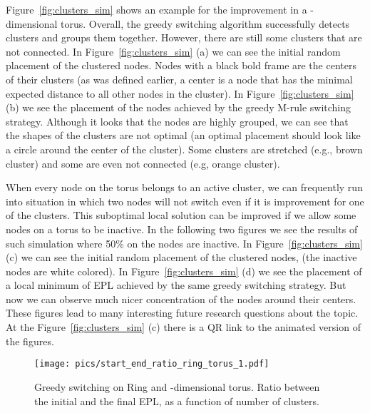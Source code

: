 \documentclass[conference]{IEEEtran}
\begin{document}
Figure~\ref{fig:clusters_sim} shows an example for the improvement in a -dimensional torus.
Overall, the greedy switching algorithm successfully detects clusters and groups them together. However, there are still some clusters that are not connected. In Figure~\ref{fig:clusters_sim} (a) we can see the initial random placement of the clustered nodes. Nodes with a black bold frame are the centers of their clusters (as was defined earlier, a center is a node that has the minimal expected distance to all other nodes in the cluster). In Figure~\ref{fig:clusters_sim} (b) we see the placement of the nodes achieved by the greedy M-rule switching strategy. Although it looks that the nodes are highly grouped, we can see that the shapes of the clusters are not optimal (an optimal placement should look like a circle around the center of the cluster). Some clusters are stretched (e.g., brown cluster) and some are even not connected (e.g, orange cluster). 

When every node on the torus belongs to an active cluster, we can frequently run into situation in which two nodes will not switch even if it is improvement for one of the clusters. This suboptimal local solution can be improved if we allow some nodes on a torus to be inactive. In the following two figures we see the results of such simulation where 50\% on the nodes are inactive. In Figure~\ref{fig:clusters_sim} (c) we can see the initial random placement of the clustered nodes, (the inactive nodes are white colored). In Figure~\ref{fig:clusters_sim} (d) we see the placement of a local minimum of EPL achieved by the same greedy switching strategy. But now we can observe much nicer concentration of the nodes around their centers. These figures lead to many interesting future research questions about the topic. 
At the Figure~\ref{fig:clusters_sim} (c) there is a QR link to the animated version of the figures.

\begin{figure}
\begin{center}
\texttt{[image: pics/start\_end\_ratio\_ring\_torus\_1.pdf]}\end{center}
\caption{\label{fig:start_end_ratio_ring_torus_1}Greedy switching on Ring and -dimensional torus. Ratio between the initial and the final EPL, as a function of number of clusters.}
\end{figure}
\end{document}

